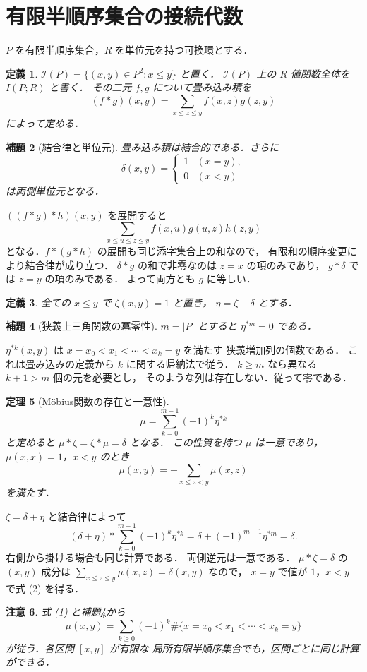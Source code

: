 \documentclass[a5paper,10pt,onecolumn]{jsarticle}
\makeatletter
\theoremstyle{mathnotetheorem}
\newtheorem{theorem}{定理}[section]
\newtheorem{definition}[theorem]{定義}
\newtheorem{lemma}[theorem]{補題}
\newtheorem{remark}[theorem]{注意}
\renewcommand{\proofname}{証明}
\renewenvironment{proof}[1][\proofname]{%
  \par\pushQED{\qed}\normalfont\topsep4\p@\@plus2\p@\relax
  \trivlist\item[\hskip\labelsep\bfseries #1]\ignorespaces
}{\popQED\endtrivlist\@endpefalse}
\makeatother
\begin{document}
\section{有限半順序集合の接続代数}
$P$ を有限半順序集合，$R$ を単位元を持つ可換環とする．
\begin{definition}
$\mathcal I(P)=\{(x,y)\in P^2:x\le y\}$ と置く．
$\mathcal I(P)$ 上の $R$ 値関数全体を $I(P;R)$ と書く．
その二元 $f,g$ について畳み込み積を
\[
 (f*g)(x,y)=\sum_{x\le z\le y}f(x,z)g(z,y)
\]
によって定める．
\end{definition}
\begin{lemma}[結合律と単位元]\label{lem:incidence}
畳み込み積は結合的である．さらに
\[
 \delta(x,y)=
 \begin{cases}1&(x=y),\\0&(x<y)\end{cases}
\]
は両側単位元となる．
\end{lemma}
\begin{proof}
$((f*g)*h)(x,y)$ を展開すると
\[
 \sum_{x\le u\le z\le y}f(x,u)g(u,z)h(z,y)
\]
となる．$f*(g*h)$ の展開も同じ添字集合上の和なので，
有限和の順序変更により結合律が成り立つ．
$\delta*g$ の和で非零なのは $z=x$ の項のみであり，
$g*\delta$ では $z=y$ の項のみである．
よって両方とも $g$ に等しい．
\end{proof}
\begin{definition}
全ての $x\le y$ で $\zeta(x,y)=1$ と置き，
$\eta=\zeta-\delta$ とする．
\end{definition}
\begin{lemma}[狭義上三角関数の冪零性]\label{lem:nil}
$m=|P|$ とすると $\eta^{*m}=0$ である．
\end{lemma}
\begin{proof}
$\eta^{*k}(x,y)$ は
$x=x_0<x_1<\cdots<x_k=y$ を満たす
狭義増加列の個数である．
これは畳み込みの定義から $k$ に関する帰納法で従う．
$k\ge m$ なら異なる $k+1>m$ 個の元を必要とし，
そのような列は存在しない．従って零である．
\end{proof}
\begin{theorem}[M\"obius関数の存在と一意性]\label{thm:mobius}
\[
 \mu=\sum_{k=0}^{m-1}(-1)^k\eta^{*k}
 \tag{1}
\]
と定めると
$\mu*\zeta=\zeta*\mu=\delta$ となる．
この性質を持つ $\mu$ は一意であり，
$\mu(x,x)=1$，$x<y$ のとき
\[
 \mu(x,y)=-\sum_{x\le z<y}\mu(x,z)
 \tag{2}
\]
を満たす．
\end{theorem}
\begin{proof}
$\zeta=\delta+\eta$ と結合律によって
\[
 (\delta+\eta)*
 \sum_{k=0}^{m-1}(-1)^k\eta^{*k}
 =\delta+(-1)^{m-1}\eta^{*m}=\delta.
\]
右側から掛ける場合も同じ計算である．
両側逆元は一意である．
$\mu*\zeta=\delta$ の $(x,y)$ 成分は
$\sum_{x\le z\le y}\mu(x,z)=\delta(x,y)$ なので，
$x=y$ で値が $1$，$x<y$ で式 (2) を得る．
\end{proof}
\begin{remark}
式 (1) と補題\ref{lem:nil}から
\[
 \mu(x,y)=\sum_{k\ge0}(-1)^k
 \#\{x=x_0<x_1<\cdots<x_k=y\}
\]
が従う．各区間 $[x,y]$ が有限な
局所有限半順序集合でも，区間ごとに同じ計算ができる．
\end{remark}
\end{document}
